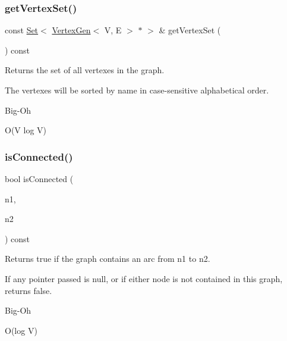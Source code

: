 \subsubsection{\texorpdfstring{get\+Vertex\+Set()}{getVertexSet()}}
{\footnotesize\ttfamily const \mbox{\hyperlink{classstanfordcpplib_1_1collections_1_1GenericSet}{Set}}$<$ \mbox{\hyperlink{classVertexGen}{Vertex\+Gen}}$<$ V, E $>$ $\ast$ $>$ \& get\+Vertex\+Set (\begin{DoxyParamCaption}{ }\end{DoxyParamCaption}) const}



Returns the set of all vertexes in the graph. 

The vertexes will be sorted by name in case-\/sensitive alphabetical order. \begin{DoxyRefDesc}{Big-\/\+Oh}
\item[\mbox{\hyperlink{BigOh__BigOh000028}{Big-\/\+Oh}}]O(\+V log V) \end{DoxyRefDesc}
\mbox{\label{classGraph_a54164ab847f3a5c7fe15d15ac95af443}} 
\subsubsection{\texorpdfstring{is\+Connected()}{isConnected()}\hspace{0.1cm}{\footnotesize\ttfamily [1/2]}}
{\footnotesize\ttfamily bool is\+Connected (\begin{DoxyParamCaption}\item[{\mbox{\hyperlink{classVertexGen}{Vertex\+Gen}}$<$ V, E $>$  $\ast$}]{n1,  }\item[{\mbox{\hyperlink{classVertexGen}{Vertex\+Gen}}$<$ V, E $>$  $\ast$}]{n2 }\end{DoxyParamCaption}) const\hspace{0.3cm}{\ttfamily [inherited]}}



Returns {\ttfamily true} if the graph contains an arc from {\ttfamily n1} to {\ttfamily n2}. 

If any pointer passed is null, or if either node is not contained in this graph, returns false. \begin{DoxyRefDesc}{Big-\/\+Oh}
\item[\mbox{\hyperlink{BigOh__BigOh000078}{Big-\/\+Oh}}]O(log V) \end{DoxyRefDesc}
\mbox{\label{classGraph_a3623b7decbedc522041c2c39d3b14421}} 
